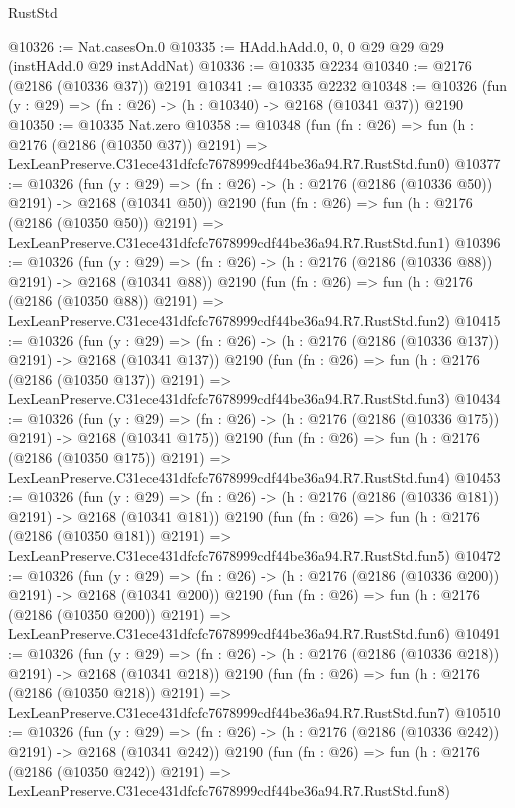 \begin{lexlean}{RustStd}
\begin{coremodule}
@10326 := Nat.casesOn.{0}
@10335 := HAdd.hAdd.{0, 0, 0} @29 @29 @29 (instHAdd.{0} @29 instAddNat)
@10336 := @10335 @2234
@10340 := @2176 (@2186 (@10336 @37)) @2191
@10341 := @10335 @2232
@10348 := @10326 (fun (y : @29) => (fn : @26) -> (h : @10340) -> @2168 (@10341 @37)) @2190
@10350 := @10335 Nat.zero
@10358 := @10348
    (fun (fn : @26) =>
    fun (h : @2176 (@2186 (@10350 @37)) @2191) =>
    LexLeanPreserve.C31ece431dfcfc7678999cdf44be36a94.R7.RustStd.fun0)
@10377 := @10326
    (fun (y : @29) => (fn : @26) -> (h : @2176 (@2186 (@10336 @50)) @2191) -> @2168 (@10341 @50))
    @2190
    (fun (fn : @26) =>
    fun (h : @2176 (@2186 (@10350 @50)) @2191) =>
    LexLeanPreserve.C31ece431dfcfc7678999cdf44be36a94.R7.RustStd.fun1)
@10396 := @10326
    (fun (y : @29) => (fn : @26) -> (h : @2176 (@2186 (@10336 @88)) @2191) -> @2168 (@10341 @88))
    @2190
    (fun (fn : @26) =>
    fun (h : @2176 (@2186 (@10350 @88)) @2191) =>
    LexLeanPreserve.C31ece431dfcfc7678999cdf44be36a94.R7.RustStd.fun2)
@10415 := @10326
    (fun (y : @29) => (fn : @26) -> (h : @2176 (@2186 (@10336 @137)) @2191) -> @2168 (@10341 @137))
    @2190
    (fun (fn : @26) =>
    fun (h : @2176 (@2186 (@10350 @137)) @2191) =>
    LexLeanPreserve.C31ece431dfcfc7678999cdf44be36a94.R7.RustStd.fun3)
@10434 := @10326
    (fun (y : @29) => (fn : @26) -> (h : @2176 (@2186 (@10336 @175)) @2191) -> @2168 (@10341 @175))
    @2190
    (fun (fn : @26) =>
    fun (h : @2176 (@2186 (@10350 @175)) @2191) =>
    LexLeanPreserve.C31ece431dfcfc7678999cdf44be36a94.R7.RustStd.fun4)
@10453 := @10326
    (fun (y : @29) => (fn : @26) -> (h : @2176 (@2186 (@10336 @181)) @2191) -> @2168 (@10341 @181))
    @2190
    (fun (fn : @26) =>
    fun (h : @2176 (@2186 (@10350 @181)) @2191) =>
    LexLeanPreserve.C31ece431dfcfc7678999cdf44be36a94.R7.RustStd.fun5)
@10472 := @10326
    (fun (y : @29) => (fn : @26) -> (h : @2176 (@2186 (@10336 @200)) @2191) -> @2168 (@10341 @200))
    @2190
    (fun (fn : @26) =>
    fun (h : @2176 (@2186 (@10350 @200)) @2191) =>
    LexLeanPreserve.C31ece431dfcfc7678999cdf44be36a94.R7.RustStd.fun6)
@10491 := @10326
    (fun (y : @29) => (fn : @26) -> (h : @2176 (@2186 (@10336 @218)) @2191) -> @2168 (@10341 @218))
    @2190
    (fun (fn : @26) =>
    fun (h : @2176 (@2186 (@10350 @218)) @2191) =>
    LexLeanPreserve.C31ece431dfcfc7678999cdf44be36a94.R7.RustStd.fun7)
@10510 := @10326
    (fun (y : @29) => (fn : @26) -> (h : @2176 (@2186 (@10336 @242)) @2191) -> @2168 (@10341 @242))
    @2190
    (fun (fn : @26) =>
    fun (h : @2176 (@2186 (@10350 @242)) @2191) =>
    LexLeanPreserve.C31ece431dfcfc7678999cdf44be36a94.R7.RustStd.fun8)

\end{coremodule}
\end{lexlean}
